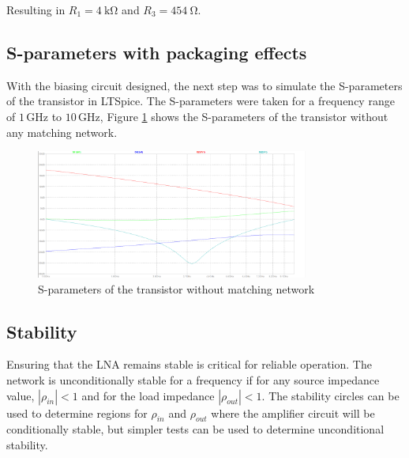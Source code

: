 Resulting in $R_1 = \SI{4}{\kilo\ohm}$ and $R_3 = \SI{454}{\ohm}$.


\subsection{S-parameters with packaging effects}

With the biasing circuit designed, the next step was to simulate the S-parameters of the transistor in LTSpice.  The S-parameters were taken for a frequency range of $1\,\si{\giga\hertz}$ to $10\,\si{\giga\hertz}$, Figure \ref{fig:withoutmathing} shows the S-parameters of the transistor without any matching network.

\begin{figure}[H]
    \centering
    \includegraphics[width=0.8\textwidth]{Images/without-matching.png}
    \caption{S-parameters of the transistor without matching network}
    \label{fig:withoutmathing}
\end{figure}



\subsection{Stability}


Ensuring that the LNA remains stable is critical for reliable operation. The network is unconditionally stable for a frequency if for any source impedance value, $|\rho_{in}|<1$  and for the load impedance $|\rho_{out}|<1$.
The stability circles can be used to determine regions for $\rho_{in}$ and $\rho_{out}$ where the amplifier circuit will be conditionally stable, but simpler tests can be used to determine unconditional stability. 


